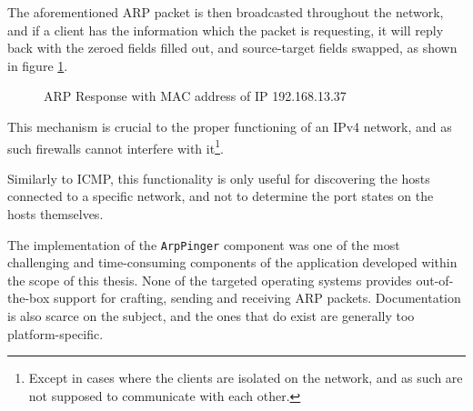 \documentclass[a4paper,12pt]{article}
\begin{document}
	The aforementioned ARP packet is then broadcasted throughout the network, and if a client has the information which the packet is requesting, it will reply back with the zeroed fields filled out, and source-target fields swapped, as shown in figure \ref{arpresp}. 
	
	\begin{figure}[!htbp]
		\centering
		\caption{ARP Response with MAC address of IP 192.168.13.37}
		\label{arpresp}
	\end{figure}

	This mechanism is crucial to the proper functioning of an IPv4 network, and as such firewalls cannot interfere with it\footnote{Except in cases where the clients are isolated on the network, and as such are not supposed to communicate with each other.}.
	
	Similarly to ICMP, this functionality is only useful for discovering the hosts connected to a specific network, and not to determine the port states on the hosts themselves.
	
 

	The implementation of the \texttt{ArpPinger} component was one of the most challenging and time-consuming components of the application developed within the scope of this thesis. None of the targeted operating systems provides out-of-the-box support for crafting, sending and receiving ARP packets. Documentation is also scarce on the subject, and the ones that do exist are generally too platform-specific.
	
\end{document}
